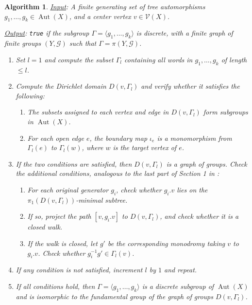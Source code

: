 \documentclass[12pt,leqno]{amsart}
\newcommand{\2}{L^2_{\rm per}(0, T)}
\newtheorem{alg}{Algorithm}[section]
\newcommand{\aut}{{\operatorname{Aut}}}
\numberwithin{equation}{section}
\numberwithin{figure}{section}
\begin{document}
\begin{alg}
    \underline{Input}: A finite generating set of tree automorphisms $g_1,\dots,g_k\in \aut(X)$, and a center vertex $v\in \mathcal{V}(X)$.
    
    \underline{Output}: \texttt{true} if the subgroup $\Gamma = \langle g_1,\dots,g_k\rangle$ is discrete, with a finite graph of finite groups $(Y,\mathcal{G})$ such that $\Gamma = \pi(Y,\mathcal{G})$.

    \begin{enumerate}
        \item Set $l=1$ and compute the subset $\Gamma_l$ containing all words in $g_1,\dots,g_k$ of length $\leq l$.
        \item Compute the Dirichlet domain $D(v,\Gamma_l)$ and verify whether it satisfies the following:
        \begin{enumerate}
            \item The subsets assigned to each vertex and edge in $D(v,\Gamma_l)$ form subgroups in $\aut(X)$.
            \item For each open edge $e$, the boundary map $\iota_e$ is a monomorphism from $\Gamma_l(e)$ to $\Gamma_l(w)$, where $w$ is the target vertex of $e$.
        \end{enumerate}
        \item If the two conditions are satisfied, then $D(v,\Gamma_l)$ is a graph of groups. Check the additional conditions, analogous to the last part of Section 1 in \cite{riley1983applications}:
        \begin{enumerate}
            \item For each original generator $g_i$, check whether $g_i.v$ lies on the $\pi_1(D(v,\Gamma_l))$-minimal subtree.
            \item If so, project the path $[v,g_i.v]$ to $D(v,\Gamma_l)$, and check whether it is a closed walk.
            \item If the walk is closed, let $g'$ be the corresponding monodromy taking $v$ to $g_i.v$. Check whether $g_i^{-1}g'\in \Gamma_l(v)$.
        \end{enumerate}
        \item If any condition is not satisfied, increment $l$ by $1$ and repeat.
        \item If all conditions hold, then $\Gamma = \langle g_1,\dots,g_k\rangle$ is a discrete subgroup of $\aut(X)$ and is isomorphic to the fundamental group of the graph of groups $D(v,\Gamma_l)$.
    \end{enumerate}
\end{alg}
\appendix
\end{document}
